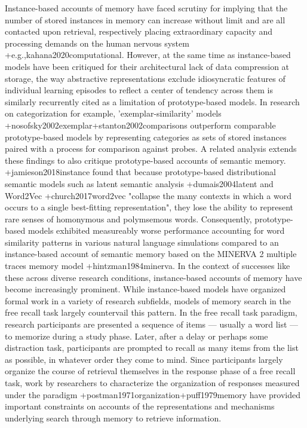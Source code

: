{}Instance-based accounts of memory have faced scrutiny for implying that the number of stored instances in memory can increase without limit and are all contacted upon retrieval, respectively placing extraordinary capacity and processing demands on the human nervous system +{e.g.,}{}{kahana2020computational}. However, at the same time as instance-based models have been critiqued for their architectural lack of data compression at storage, the way abstractive representations exclude idiosyncratic features of individual learning episodes to reflect a center of tendency across them is similarly recurrently cited as a limitation of prototype-based models. In research on categorization for example, 'exemplar-similarity' models +{}{}{nosofsky2002exemplar}+{}{}{stanton2002comparisons} outperform comparable prototype-based models by representing categories as sets of stored instances paired with a process for comparison against probes. A related analysis extends these findings to also critique prototype-based accounts of semantic memory. +{}{}{jamieson2018instance} found that because prototype-based distributional semantic models such as latent semantic analysis +{}{}{dumais2004latent} and Word2Vec +{}{}{church2017word2vec} "collapse the many contexts in which a word occurs to a single best-fitting representation", they lose the ability to represent rare senses of homonymous and polymsemous words. Consequently, prototype-based models exhibited measureably worse performance accounting for word similarity patterns in various natural language simulations compared to an instance-based account of semantic memory based on the MINERVA 2 multiple traces memory model +{}{}{hintzman1984minerva}. In the context of successes like these across diverse research conditions, instance-based accounts of memory have become increasingly prominent.\markdownRendererInterblockSeparator
{}While instance-based models have organized formal work in a variety of research subfields, models of memory search in the free recall task largely countervail this pattern. In the free recall task paradigm, research participants are presented a sequence of items --- usually a word list --- to memorize during a study phase. Later, after a delay or perhaps some distraction task, participants are prompted to recall as many items from the list as possible, in whatever order they come to mind. Since participants largely organize the course of retrieval themselves in the response phase of a free recall task, work by researchers to characterize the organization of responses measured under the paradigm +{}{}{postman1971organization}+{}{}{puff1979memory} have provided important constraints on accounts of the representations and mechanisms underlying search through memory to retrieve information.\markdownRendererInterblockSeparator
